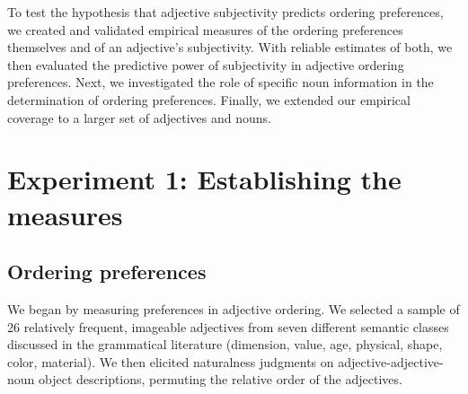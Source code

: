 \documentclass[12pt]{article}
\begin{document}
To test the hypothesis that adjective subjectivity predicts ordering preferences, we created and validated empirical measures of the ordering preferences themselves and of an adjective's subjectivity. With reliable estimates of both, we then evaluated the predictive power of subjectivity in adjective ordering preferences. Next, we investigated the role of specific noun information in the determination of ordering preferences. Finally, we extended our empirical coverage to a larger set of adjectives and nouns.

\section{Experiment 1: Establishing the measures}

\subsection{Ordering preferences}

We began by measuring preferences in adjective ordering. We selected a sample of 26 relatively frequent, imageable adjectives from seven different semantic classes discussed in the grammatical literature (dimension, value, age, physical, shape, color, material). 
We then elicited naturalness judgments on adjective-adjective-noun object descriptions, permuting the relative order of the adjectives.
\end{document}
